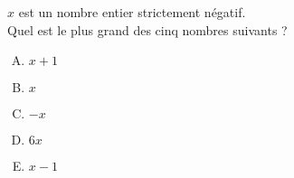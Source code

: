 $x$ est un nombre entier strictement négatif.\\
Quel est le plus grand des cinq nombres suivants ?
\begin{multicols}{5}
  \begin{enumerate}[A)]
  \item $x + 1$
  \item $x$
  \item $- x$
  \item $6x$
  \item $x-1$
  \end{enumerate}
\end{multicols}